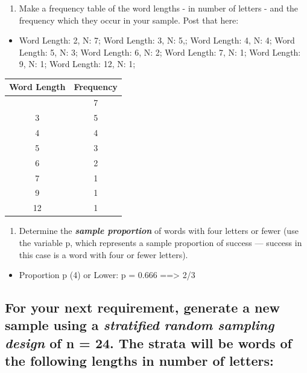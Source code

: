 \documentclass[letterpaper]{article}
\def\tightlist{}
\begin{document}
\begin{enumerate}
\def\labelenumi{\alph{enumi}.}
\setcounter{enumi}{1}
\tightlist
\item
  Make a frequency table of the word lengths - in number of letters - and the frequency which they occur in your sample. Post that here:
\end{enumerate}

\begin{itemize}
\tightlist
\item
  Word Length: 2, N: 7;
  Word Length: 3, N: 5,;
  Word Length: 4, N: 4;
  Word Length: 5, N: 3;
  Word Length: 6, N: 2;
  Word Length: 7, N: 1;
  Word Length: 9, N: 1;
  Word Length: 12, N: 1;
\end{itemize}

\begin{longtable}[]{@{}cc@{}}
\toprule\noalign{}
Word Length & Frequency \\
\midrule\noalign{}
\endhead
\bottomrule\noalign{}
\endlastfoot
2 & 7 \\
3 & 5 \\
4 & 4 \\
5 & 3 \\
6 & 2 \\
7 & 1 \\
9 & 1 \\
12 & 1 \\
\end{longtable}

\begin{enumerate}
\def\labelenumi{\alph{enumi}.}
\setcounter{enumi}{2}
\tightlist
\item
  Determine the \textbf{\emph{sample proportion}} of words with four letters or fewer (use the variable p, which represents a sample proportion of success --- success in this case is a word with four or fewer letters).
\end{enumerate}

\begin{itemize}
\tightlist
\item
  Proportion p (4) or Lower: p = 0.666 ==\textgreater{} 2/3
\end{itemize}

\subsection{\texorpdfstring{For your next requirement, generate a new sample using a \textbf{\emph{stratified random sampling design}} of n = 24. The strata will be words of the following lengths in number of letters:}{For your next requirement, generate a new sample using a stratified random sampling design of n = 24. The strata will be words of the following lengths in number of letters:}}\label{for-your-next-requirement-generate-a-new-sample-using-a-stratified-random-sampling-design-of-n-24.-the-strata-will-be-words-of-the-following-lengths-in-number-of-letters}
\end{document}
